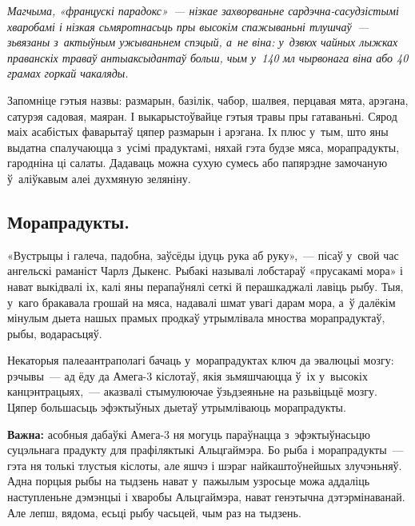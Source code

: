 \emph{Магчыма, «францускі парадокс»~--- нізкае захворваньне сар\-дэч\-на-сасудзістымі хваробамі і нізкая сьмяротнасьць пры высокім спажываньні тлушчаў~--- зьвязаны з~актыўным ужываньнем спэцый, а~не віна: у~дзвюх чайных лыжках праванскіх траваў антыаксыдантаў больш, чым у~140 мл чырвонага віна або 40 грамах горкай чакаляды.}

Запомніце гэтыя назвы: размарын, базілік, чабор, шалвея, перцавая мята, арэгана, сатурэя садовая, маяран. І выкарыстоўвайце гэтыя травы пры гатаваньні. Сярод маіх асабістых фаварытаў цяпер размарын і арэгана. Іх плюс у~тым, што яны выдатна спалучаюцца з~усімі прадуктамі, няхай гэта будзе мяса, морапрадукты, гародніна ці салаты. Дадаваць можна сухую сумесь або папярэдне замочаную ў~аліўкавым алеі духмяную зеляніну.

\subsection*{Морапрадукты.}

«Вустрыцы і галеча, падобна, заўсёды ідуць рука аб руку»,~--- пісаў у~свой час ангельскі раманіст Чарлз Дыкенс. Рыбакі называлі лобстараў «прусакамі мора» і нават выкідвалі іх, калі яны перапаўнялі сеткі й перашкаджалі лавіць рыбу. Тыя, у~каго бракавала грошай на мяса, надавалі шмат увагі дарам мора, а~ў далёкім мінулым дыета нашых прамых продкаў утрымлівала мноства морапрадуктаў, рыбы, водарасьцяў.

Некаторыя палеаантраполагі бачаць у~морапрадуктах ключ да эвалюцыі мозгу: рэчывы~--- ад ёду да Амега-3 кіслотаў, якія зьмяшчаюцца ў~іх у~высокіх канцэнтрацыях,~--- аказвалі стымулюючае ўзьдзеяньне на разьвіцьцё мозгу. Цяпер большасьць эфэктыўных дыетаў утрымліваюць морапрадукты. 


\textbf{Важна:} асобныя дабаўкі Амега-3 ня могуць параўнацца з~эфэктыўнасьцю суцэльнага прадукту для прафіляктыкі Альцгаймэра. Бо рыба і морапрадукты~--- гэта ня толькі тлустыя кіслоты, але яшчэ і шэраг найкаштоўнейшых злучэньняў. Адна порцыя рыбы на тыдзень нават у~пажылым узросьце можа аддаліць наступленьне дэмэнцыі і хваробы Альцгаймэра, нават генэтычна дэтэрмінаванай. Але лепш, вядома, есьці рыбу часьцей, чым раз на тыдзень.

